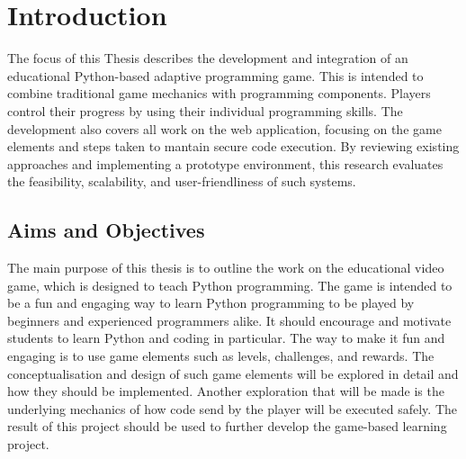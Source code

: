 \section{Introduction}
The focus of this Thesis describes the development and integration of an educational Python-based adaptive programming game. This is intended to combine traditional game mechanics with programming components. Players control their progress by using their individual programming skills. The development also covers all work on the web application, focusing on the game elements and steps taken to mantain secure code execution. By reviewing existing approaches and implementing a prototype environment, this research evaluates the feasibility, scalability, and user-friendliness of such systems.

\subsection{Aims and Objectives} 
The main purpose of this thesis is to outline the work on the educational video game, which is designed to teach Python programming. The game is intended to be a fun and engaging way to learn Python programming to be played by beginners and experienced programmers alike.  It should encourage and motivate students to learn Python and coding in particular. The way to make it fun and engaging is to use game elements such as levels, challenges, and rewards. The conceptualisation and design of such game elements will be explored in detail and how they should be implemented. Another exploration that will be made is the underlying mechanics of how code send by the player will be executed safely. The result of this project should be used to further develop the game-based learning project. 